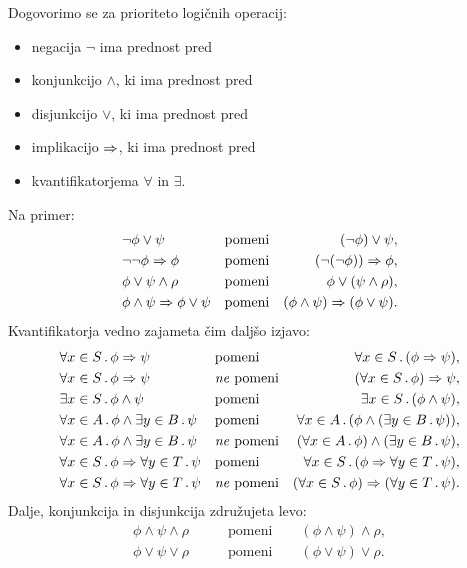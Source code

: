 Dogovorimo se za prioriteto logičnih operacij:
%
\begin{itemize}
\item negacija $\lnot$ ima prednost pred
\item konjunkcijo $\land$, ki ima prednost pred
\item disjunkcijo $\lor$, ki ima prednost pred
\item implikacijo $\Rightarrow$, ki ima prednost pred
\item kvantifikatorjema $\forall$ in $\exists$.
\end{itemize}
%
Na primer:
%
\begin{align*}
  &\lnot \phi \lor \psi
    &&\text{pomeni}
  &(\lnot \phi) \lor \psi, \\
  &\lnot \lnot \phi \Rightarrow \phi
    &&\text{pomeni}
  &(\lnot(\lnot\phi)) \Rightarrow \phi, \\
  &\phi \lor \psi \land \rho
    &&\text{pomeni}
  &\phi \lor (\psi \land \rho), \\
  &\phi \land \psi \Rightarrow \phi \lor \psi
    &&\text{pomeni}
  &(\phi \land \psi) \Rightarrow (\phi \lor \psi).
\end{align*}
%
Kvantifikatorja vedno zajameta čim daljšo izjavo:
%
\begin{align*}
  &\forall x \in S \,.\, \phi \Rightarrow \psi
    &&\text{pomeni}
  &\forall x \in S \,.\, (\phi \Rightarrow \psi), \\
  &\forall x \in S \,.\, \phi \Rightarrow \psi
    &&\text{\emph{ne} pomeni}
  &(\forall x \in S \,.\, \phi) \Rightarrow \psi,\\
  &\exists x \in S \,.\, \phi \land \psi
    &&\text{pomeni}
  &\exists x \in S \,.\, (\phi \land \psi), \\
  &\forall x \in A \,.\, \phi \land \exists y \in B \,.\, \psi
    &&\text{pomeni}
  &\forall x \in A \,.\, (\phi \land (\exists y \in B \,.\, \psi)), \\
  &\forall x \in A \,.\, \phi \land \exists y \in B \,.\, \psi
    &&\text{\emph{ne} pomeni}
  &(\forall x \in A \,.\, \phi) \land (\exists y \in B \,.\, \psi), \\
  &\forall x \in S \,.\, \phi \Rightarrow \forall y \in T \,.\, \psi
    &&\text{pomeni}
  &\forall x \in S \,.\, (\phi \Rightarrow \forall y \in T \,.\, \psi), \\
  &\forall x \in S \,.\, \phi \Rightarrow \forall y \in T \,.\, \psi
    &&\text{\emph{ne} pomeni}
  &(\forall x \in S \,.\, \phi) \Rightarrow (\forall y \in T \,.\, \psi).
\end{align*}
%
Dalje, konjunkcija in disjunkcija združujeta levo:
% 
\begin{align*}
  \phi \land \psi \land \rho
  &\qquad\text{pomeni}\qquad
  (\phi \land \psi) \land \rho,\\
  \phi \lor \psi \lor \rho
  &\qquad\text{pomeni}\qquad
  (\phi \lor \psi) \lor \rho.
\end{align*}
